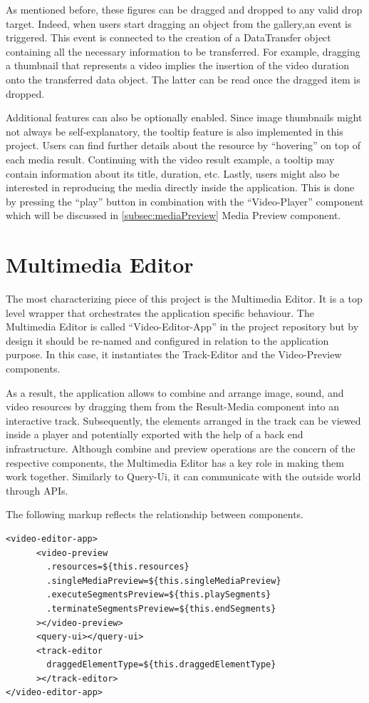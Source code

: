 As mentioned before, these figures can be dragged and dropped to any valid drop target. Indeed, when users start dragging an object from the gallery,an event is triggered. This event is connected to the creation of a DataTransfer object containing all the necessary information to be transferred. For example, dragging a thumbnail that represents a video implies the insertion of the video duration onto the transferred data object. The latter can be read once the dragged item is dropped.

Additional features can also be optionally enabled. Since image thumbnails might not always be self-explanatory, the tooltip feature is also implemented in this project. Users can find further details about the resource by “hovering” on top of each media result. Continuing with the video result example, a tooltip may contain information about its title, duration, etc. Lastly, users might also be interested in reproducing the media directly inside the application. This is done by pressing the “play” button in combination with the “Video-Player” component which will be discussed in \ref{subsec:mediaPreview} Media Preview component.

\section{Multimedia Editor}
\label{sec:multimediaEditor}

The most characterizing piece of this project is the Multimedia Editor. It is a top level wrapper that orchestrates the application specific behaviour. The Multimedia Editor is called “Video-Editor-App” in the project repository but by design it should be re-named and configured in relation to the application purpose. In this case, it instantiates the Track-Editor and the Video-Preview components.

As a result, the application allows to combine and arrange image, sound, and video resources by dragging them from the Result-Media component into an interactive track. Subsequently, the elements arranged in the track can be viewed inside a player and potentially exported with the help of a back end infrastructure. Although combine and preview operations are the concern of the respective components, the Multimedia Editor has a key role in making them work together. Similarly to Query-Ui, it can communicate with the outside world through APIs.

The following markup reflects the relationship between components.
\\
\begin{lstlisting}[caption={Video-Editor-App component instantiation},label={videoAppComp}, language=HTML5]
<video-editor-app>      
      <video-preview
        .resources=${this.resources}
        .singleMediaPreview=${this.singleMediaPreview}
        .executeSegmentsPreview=${this.playSegments}
        .terminateSegmentsPreview=${this.endSegments}
      ></video-preview>
      <query-ui></query-ui>
      <track-editor
        draggedElementType=${this.draggedElementType}
      ></track-editor>
</video-editor-app>
\end{lstlisting}

